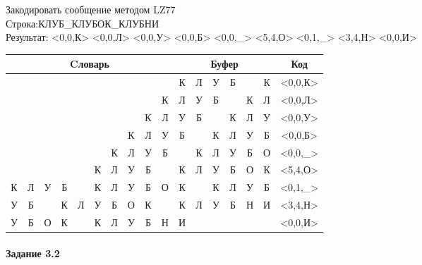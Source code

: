 \documentclass[a4paper, 12pt]{article}
\begin{document}
Закодировать сообщение методом LZ77\\
Строка:КЛУБ\_КЛУБОК\_КЛУБНИ\\
Результат: <0,0,К> <0,0,Л> <0,0,У> <0,0,Б> <0,0,\_> <5,4,О> <0,1,\_> <3,4,Н> <0,0,И>\\
\begin{table}[h!]
\centering
\begin{tabular}{|c|c|c|c|c|c|c|c|c|c|c|c|c|c|c|c|c|} 
\hline
\multicolumn{10}{|c|}{Cловарь} & \multicolumn{6}{c|}{Буфер} & Код  \\ \hline
  &   &   &   &   &   &   &   &   &   & \cellcolor[HTML]{8CE4F6} К & Л & У & Б &   & К & <0,0,К>
\\ \hline
  &   &   &   &   &   &   &   &   & К & \cellcolor[HTML]{8CE4F6} Л & У & Б &   & К & Л & <0,0,Л>
\\ \hline
  &   &   &   &   &   &   &   & К & Л & \cellcolor[HTML]{8CE4F6} У & Б &   & К & Л & У & <0,0,У>
\\ \hline
  &   &   &   &   &   &   & К & Л & У & \cellcolor[HTML]{8CE4F6} Б &   & К & Л & У & Б & <0,0,Б>
\\ \hline
  &   &   &   &   &   & К & Л & У & Б & \cellcolor[HTML]{8CE4F6}   & К & Л & У & Б & О & <0,0,\_>
\\ \hline
  &   &   &   &   & \cellcolor[HTML]{FFFF00} К & \cellcolor[HTML]{FFFF00} Л & \cellcolor[HTML]{FFFF00} У & \cellcolor[HTML]{FFFF00} Б &   & \cellcolor[HTML]{FFFF00} К & \cellcolor[HTML]{FFFF00} Л & \cellcolor[HTML]{FFFF00} У & \cellcolor[HTML]{FFFF00} Б & \cellcolor[HTML]{8CE4F6} О & К & <5,4,О>
\\ \hline
\cellcolor[HTML]{FFFF00} К & Л & У & Б &   & К & Л & У & Б & О & \cellcolor[HTML]{FFFF00} К & \cellcolor[HTML]{8CE4F6}   & К & Л & У & Б & <0,1,\_>
\\ \hline
У & Б &   & \cellcolor[HTML]{FFFF00} К & \cellcolor[HTML]{FFFF00} Л & \cellcolor[HTML]{FFFF00} У & \cellcolor[HTML]{FFFF00} Б & О & К &   & \cellcolor[HTML]{FFFF00} К & \cellcolor[HTML]{FFFF00} Л & \cellcolor[HTML]{FFFF00} У & \cellcolor[HTML]{FFFF00} Б & \cellcolor[HTML]{8CE4F6} Н & И & <3,4,Н>
\\ \hline
У & Б & О & К &   & К & Л & У & Б & Н & \cellcolor[HTML]{8CE4F6} И &   &   &   &   &   & <0,0,И>
\\ \hline
\end{tabular}
\end{table}

\paragraph{Задание 3.2}
\end{document}
